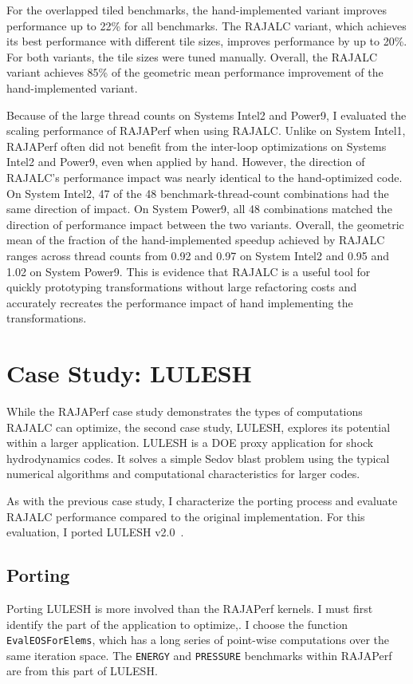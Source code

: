 For the overlapped tiled benchmarks, the hand-implemented variant improves
performance up to 22\% for all benchmarks.
The RAJALC variant, which achieves its best performance with different tile sizes, improves performance by 
up to 20\%.
For both variants, the tile sizes were tuned manually.
Overall, the RAJALC variant achieves 85\% of the geometric mean performance
improvement of the hand-implemented variant. 


Because of the large thread counts on Systems Intel2 and Power9, I evaluated the scaling performance of RAJAPerf when using RAJALC.
Unlike on System Intel1, RAJAPerf often did not benefit from the inter-loop
optimizations on Systems Intel2 and Power9, even when applied by hand. 
However, the direction of RAJALC's performance impact was nearly identical to the hand-optimized code. 
On System Intel2, 47 of the 48 benchmark-thread-count combinations had the same direction of impact.
On System Power9, all 48 combinations matched the direction of performance impact between the two variants.
Overall, the geometric mean of the fraction of the hand-implemented speedup achieved by RAJALC ranges across thread counts from 0.92 and 0.97 on System Intel2 and 0.95 and 1.02 on System Power9. 
This is evidence that RAJALC is a useful tool for quickly prototyping transformations without large refactoring costs and accurately recreates the performance impact of hand implementing the transformations.

\section{Case Study: LULESH}

While the RAJAPerf case study demonstrates the types of computations RAJALC
can optimize, the second case study, LULESH, explores its potential within a
larger application.
LULESH is a DOE proxy application for shock hydrodynamics codes.
It solves a simple Sedov blast problem using the typical numerical algorithms and computational characteristics for larger codes.

As with the previous case study, I characterize the porting process and
evaluate RAJALC performance compared to the original implementation.
For this evaluation, I ported LULESH v2.0~\cite{LULESH2}. 

\subsection{Porting}

Porting LULESH is more involved than the RAJAPerf kernels. 
I must first identify the part of the application to optimize,.
I choose the function \verb.EvalEOSForElems., which has a long series
of point-wise computations over the same iteration space.
The \verb.ENERGY. and \verb.PRESSURE. benchmarks within RAJAPerf are
from this part of LULESH.

